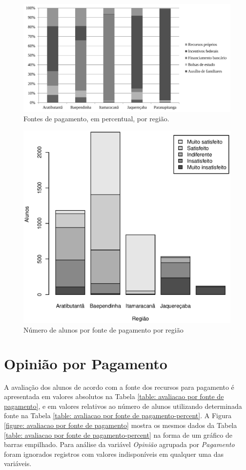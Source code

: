 \documentclass[10pt,a4paper,oneside]{article}
\begin{document}
\begin{figure}[!h]
	\centering
	\includegraphics[width=0.80\linewidth]{plots/q11}
	\caption{Fontes de pagamento, em percentual, por região.}
	\label{figure: fonte de pagemento}
\end{figure}

\begin{figure}[!h]
	\centering
	\includegraphics[width=.65\linewidth]{plots/stacked_pagamento_por_regiao.eps}
	\caption{Número de alunos por fonte de pagamento por região}
	\label{fig:fonte de pagamento absoluto}
\end{figure}


\FloatBarrier
\section{Opinião por Pagamento}
\label{section:opiniao-pagamento}

A avaliação dos alunos de acordo com a fonte dos recursos para pagamento é apresentada em valores absolutos na Tabela \ref{table: avaliacao por fonte de pagamento}, e em valores relativos ao número de alunos utilizando determinada fonte na Tabela \ref{table: avaliacao por fonte de pagamento-percent}. A Figura \ref{figure: avaliacao por fonte de pagamento} mostra os mesmos dados da Tabela \ref{table: avaliacao por fonte de pagamento-percent} na forma de um gráfico de barras empilhado. Para análise da variável \textit{Opinião} agrupada por \textit{Pagamento} foram ignorados registros com valores indisponíveis em qualquer uma das variáveis. 
\end{document}
